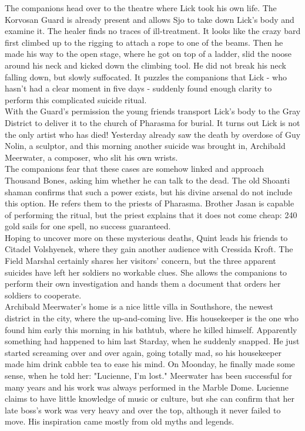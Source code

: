 The companions head over to the theatre where Lick took his own life. The Korvosan Guard is already present and allows Sjo to take down Lick's body and examine it. The healer finds no traces of ill-treatment. It looks like the crazy bard first climbed up to the rigging to attach a rope to one of the beams. Then he made his way to the open stage, where he got on top of a ladder, slid the noose around his neck and kicked down the climbing tool. He did not break his neck falling down, but slowly suffocated. It puzzles the companions that Lick - who hasn't had a clear moment in five days - suddenly found enough clarity to perform this complicated suicide ritual.\\

With the Guard's permission the young friends transport Lick's body to the Gray District to deliver it to the church of Pharasma for burial. It turns out Lick is not the only artist who has died! Yesterday already saw the death by overdose of Guy Nolin, a sculptor, and this morning another suicide was brought in, Archibald Meerwater, a composer, who slit his own wrists.\\

The companions fear that these cases are somehow linked and approach Thousand Bones, asking him whether he can talk to the dead. The old Shoanti shaman confirms that such a power exists, but his divine arsenal do not include this option. He refers them to the priests of Pharasma. Brother Jasan is capable of performing the ritual, but the priest explains that it does not come cheap: 240 gold sails for one spell, no success guaranteed.\\

Hoping to uncover more on these mysterious deaths, Quint leads his friends to Citadel Volshyenek, where they gain another audience with Cressida Kroft. The Field Marshal certainly shares her visitors' concern, but the three apparent suicides have left her soldiers no workable clues. She allows the companions to perform their own investigation and hands them a document that orders her soldiers to cooperate.\\

Archibald Meerwater's home is a nice little villa in Southshore, the newest district in the city, where the up-and-coming live. His housekeeper is the one who found him early this morning in his bathtub, where he killed himself. Apparently something had happened to him last Starday, when he suddenly snapped. He just started screaming over and over again, going totally mad, so his housekeeper made him drink cabble tea to ease his mind. On Moonday, he finally made some sense, when he told her: "Lucienne, I'm lost." Meerwater has been successful for many years and his work was always performed in the Marble Dome. Lucienne claims to have little knowledge of music or culture, but she can confirm that her late boss's work was very heavy and over the top, although it never failed to move. His inspiration came mostly from old myths and legends.\\


